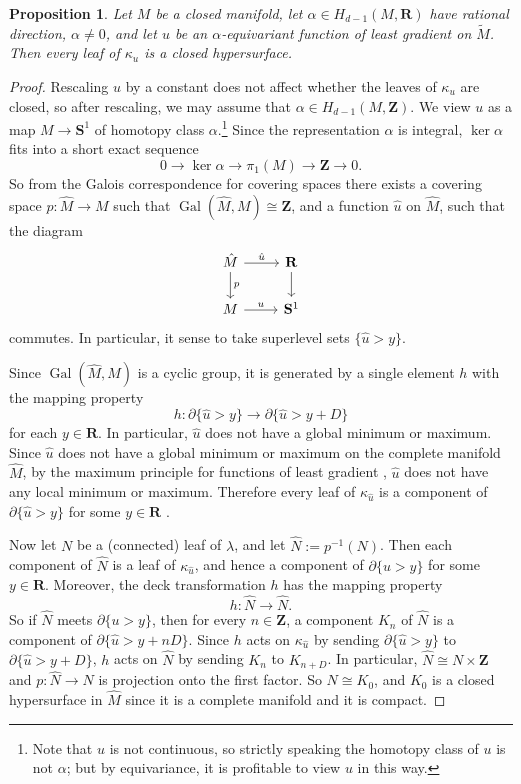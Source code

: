 \documentclass[reqno,11pt]{amsart}
\newcommand{\ZZ}{\mathbf{Z}}
\newcommand{\RR}{\mathbf{R}}
\newcommand{\Sph}{\mathbf S}
\DeclareMathOperator{\Gal}{Gal}
\newtheorem{proposition}[theorem]{Proposition}
\theoremstyle{definition}
\numberwithin{equation}{section}
\begin{document}
\begin{proposition}
Let $M$ be a closed manifold, let $\alpha \in H_{d - 1}(M, \RR)$ have rational direction, $\alpha \neq 0$, and let $u$ be an $\alpha$-equivariant function of least gradient on $\tilde M$.
Then every leaf of $\kappa_u$ is a closed hypersurface.
\end{proposition}
\begin{proof}
Rescaling $u$ by a constant does not affect whether the leaves of $\kappa_u$ are closed, so after rescaling, we may assume that $\alpha \in H_{d - 1}(M, \ZZ)$.
We view $u$ as a map $M \to \Sph^1$ of homotopy class $\alpha$.\footnote{Note that $u$ is not continuous, so strictly speaking the homotopy class of $u$ is not $\alpha$; but by equivariance, it is profitable to view $u$ in this way.}
Since the representation $\alpha$ is integral, $\ker \alpha$ fits into a short exact sequence 
$$0 \to \ker \alpha \to \pi_1(M) \to \ZZ \to 0.$$
So from the Galois correspondence for covering spaces there exists a covering space $p: \hat M \to M$ such that $\Gal(\hat M, M) \cong \ZZ$, and a function $\hat u$ on $\hat M$, such that the diagram 
$$\begin{tikzcd}
\hat M \arrow[r, "\hat u"] \arrow[d, "p"] & \RR \arrow[d] \\
M \arrow[r, "u"] & \Sph^1
\end{tikzcd}$$
commutes.
In particular, it sense to take superlevel sets $\{\hat u > y\}$.

Since $\Gal(\hat M, M)$ is a cyclic group, it is generated by a single element $h$ with the mapping property
$$h: \partial \{\hat u > y\} \to \partial \{\hat u > y + D\}$$
for each $y \in \RR$.
In particular, $\hat u$ does not have a global minimum or maximum.
Since $\hat u$ does not have a global minimum or maximum on the complete manifold $\hat M$, by the maximum principle for functions of least gradient \cite[Theorem 5.1]{HakkarainenKorteLahtiShanmugalingam+2015}, $\hat u$ does not have any local minimum or maximum.
Therefore every leaf of $\kappa_{\hat u}$ is a component of $\partial \{\hat u > y\}$ for some $y \in \RR$ \cite[Proposition 4.7]{BackusCML}.

Now let $N$ be a (connected) leaf of $\lambda$, and let $\hat N := p^{-1}(N)$.
Then each component of $\hat N$ is a leaf of $\kappa_{\hat u}$, and hence a component of $\partial \{u > y\}$ for some $y \in \RR$.
Moreover, the deck transformation $h$ has the mapping property
$$h: \hat N \to \hat N.$$
So if $\hat N$ meets $\partial \{u > y\}$, then for every $n \in \ZZ$, a component $K_n$ of $\hat N$ is a component of $\partial \{\hat u > y + nD\}$.
Since $h$ acts on $\kappa_{\hat u}$ by sending $\partial \{\hat u > y\}$ to $\partial \{\hat u > y + D\}$, $h$ acts on $\hat N$ by sending $K_n$ to $K_{n + D}$.
In particular, $\hat N \cong N \times \ZZ$ and $p: \hat N \to N$ is projection onto the first factor. 
So $N \cong K_0$, and $K_0$ is a closed hypersurface in $\hat M$ since it is a complete manifold \cite[Theorem 3.3]{BackusCML} and it is compact.
\end{proof}
\end{document}
